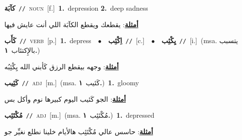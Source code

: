 \documentclass[10pt,a4paper,twoside]{article} %
\begin{document}
\begin{multicols}{2}
{\setlength\topsep{0pt}\textbf{\foreignlanguage{arabic}{كآبَة}}\ {\color{gray}\texttt{//}\color{black}}\ \textsc{noun}\ [f.]\ \textbf{1.}~depression  \textbf{2.}~deep sadness\  \begin{flushright}\color{gray}\foreignlanguage{arabic}{\textbf{\underline{\foreignlanguage{arabic}{أمثلة}}}: يقطعك ويقطع الكآبَة اللي أنت عايش فيها}\end{flushright}\color{black}} \vspace{2mm}

{\setlength\topsep{0pt}\textbf{\foreignlanguage{arabic}{كَأَب}}\ {\color{gray}\texttt{//}\color{black}}\ \textsc{verb}\ [p.]\ \textbf{1.}~depress\ \ $\bullet$\ \ \setlength\topsep{0pt}\textbf{\foreignlanguage{arabic}{اِكْئِب}}\ {\color{gray}\texttt{//}\color{black}}\ [c.]\ \ $\bullet$\ \ \setlength\topsep{0pt}\textbf{\foreignlanguage{arabic}{يِكْئِب}}\ {\color{gray}\texttt{//}\color{black}}\ [i.]\ \color{gray}(msa. \foreignlanguage{arabic}{يتسبب بالإِكتئاب}~\foreignlanguage{arabic}{\textbf{١.}})\color{black}\  \begin{flushright}\color{gray}\foreignlanguage{arabic}{\textbf{\underline{\foreignlanguage{arabic}{أمثلة}}}: وجهه بيقطع الرزق كَأبني الله يِكْئِبُه}\end{flushright}\color{black}} \vspace{2mm}

{\setlength\topsep{0pt}\textbf{\foreignlanguage{arabic}{كَئِيب}}\ {\color{gray}\texttt{//}\color{black}}\ \textsc{adj}\ [m.]\ \color{gray}(msa. \foreignlanguage{arabic}{كَئيب}~\foreignlanguage{arabic}{\textbf{١.}})\color{black}\ \textbf{1.}~gloomy\  \begin{flushright}\color{gray}\foreignlanguage{arabic}{\textbf{\underline{\foreignlanguage{arabic}{أمثلة}}}: الجو كَئيب اليوم كبيرها نوم وأكل بس}\end{flushright}\color{black}} \vspace{2mm}

{\setlength\topsep{0pt}\textbf{\foreignlanguage{arabic}{مُكْتَئِب}}\ {\color{gray}\texttt{//}\color{black}}\ \textsc{adj}\ [m.]\ \color{gray}(msa. \foreignlanguage{arabic}{مُكْتَئِب}~\foreignlanguage{arabic}{\textbf{١.}})\color{black}\ \textbf{1.}~depressed\  \begin{flushright}\color{gray}\foreignlanguage{arabic}{\textbf{\underline{\foreignlanguage{arabic}{أمثلة}}}: حاسس عالي مُكْتَئِب هالأيام خلينا نطلع نغيِّر جو}\end{flushright}\color{black}} \vspace{2mm}


\end{multicols}
\end{document}

